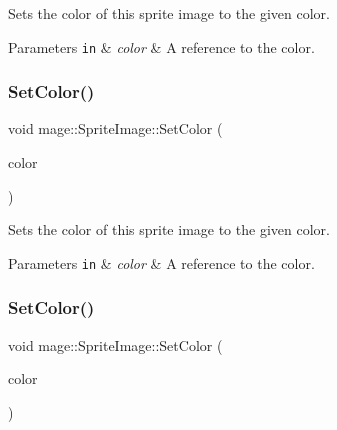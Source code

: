 Sets the color of this sprite image to the given color.


\begin{DoxyParams}[1]{Parameters}
\mbox{\tt in}  & {\em color} & A reference to the color. \\
\hline
\end{DoxyParams}
\hypertarget{classmage_1_1_sprite_image_a27b191565b90ee8fe78b7db3be0c9bb2}{}\label{classmage_1_1_sprite_image_a27b191565b90ee8fe78b7db3be0c9bb2} 
\subsubsection{\texorpdfstring{Set\+Color()}{SetColor()}\hspace{0.1cm}{\footnotesize\ttfamily [2/3]}}
{\footnotesize\ttfamily void mage\+::\+Sprite\+Image\+::\+Set\+Color (\begin{DoxyParamCaption}\item[{\hyperlink{structmage_1_1_color}{Color} \&\&}]{color }\end{DoxyParamCaption})\hspace{0.3cm}{\ttfamily [noexcept]}}

Sets the color of this sprite image to the given color.


\begin{DoxyParams}[1]{Parameters}
\mbox{\tt in}  & {\em color} & A reference to the color. \\
\hline
\end{DoxyParams}
\hypertarget{classmage_1_1_sprite_image_a4ee2d13c618ef1c16e4cee8433f3d5dd}{}\label{classmage_1_1_sprite_image_a4ee2d13c618ef1c16e4cee8433f3d5dd} 
\subsubsection{\texorpdfstring{Set\+Color()}{SetColor()}\hspace{0.1cm}{\footnotesize\ttfamily [3/3]}}
{\footnotesize\ttfamily void mage\+::\+Sprite\+Image\+::\+Set\+Color (\begin{DoxyParamCaption}\item[{const X\+M\+V\+E\+C\+T\+OR \&}]{color }\end{DoxyParamCaption})\hspace{0.3cm}{\ttfamily [noexcept]}}

